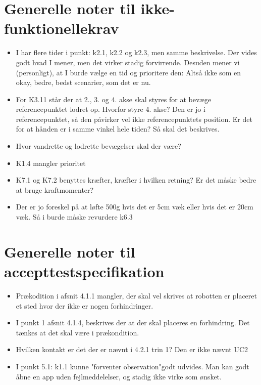 \documentclass[a4paper,12pt,fleqn,oneside]{article}
\begin{document}
\section{Generelle noter til ikke-funktionellekrav }
\begin{itemize}
\item I har flere tider i punkt: k2.1, k2.2 og k2.3, men samme beskrivelse. Der vides godt hvad I mener, men det virker stadig forvirrende. Desuden mener vi (personligt), at I burde vælge en tid og prioritere den: Altså ikke som en okay, bedre, bedst scenarier, som det er nu.
\item For K3.11 står der at 2., 3. og 4. akse skal styres for at bevæge referencepunktet lodret op. Hvorfor styre 4. akse? Den er jo i referencepunktet, så den påvirker vel ikke referencepunktets position. Er det for at hånden er i samme vinkel hele tiden? Så skal det beskrives.
\item Hvor vandrette og lodrette bevægelser skal der være?
\item K1.4 mangler prioritet
\item K7.1 og K7.2 benyttes kræfter, kræfter i hvilken retning? Er det måske bedre at bruge kraftmomenter?
\item Der er jo foreskel på at løfte 500g hvis det er 5cm væk eller hvis det er 20cm væk. Så i burde måske revurdere k6.3
\end{itemize}


\section{Generelle noter til accepttestspecifikation}
\begin{itemize}
\item Prækodition i afsnit 4.1.1 mangler, der skal vel skrives at robotten er placeret et sted hvor der ikke er nogen forhindringer.
\item I punkt 1 afsnit 4.1.4, beskrives der at der skal placeres en forhindring. Det tænkes at det skal være i prækondition.
\item Hvilken kontakt er det der er nævnt i 4.2.1 trin 1? Den er ikke nævnt UC2
\item I punkt 5.1: k1.1 kunne "forventer observation"\space godt udvides. Man kan godt åbne en app uden fejlmeddelelser, og stadig ikke virke som ønsket.
\end{itemize}
\end{document}
